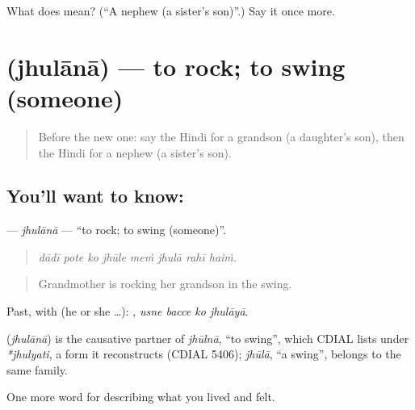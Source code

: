 \begin{tcolorbox}[breakable,colback=teal!4,colframe=teal!35!black,title={Before you move on}]
What does  mean? (\textquotedblleft{}A nephew (a sister's son)\textquotedblright{}.) Say it once more.
\end{tcolorbox}
\section[\texorpdfstring{\hi{झुलाना} (jhulānā)}{झुलाना (jhulānā)}]{ (jhulānā) — to rock; to swing (someone)}

\label{lesson:HI-C502-jhulana}



\begin{quote}
Before the new one: say the Hindi for a grandson (a daughter's son), then the Hindi for a nephew (a sister's son).
\end{quote}

\subsection*{You'll want to know: }
\textbf{} — \emph{jhulānā} — \textquotedblleft{}to rock; to swing (someone)\textquotedblright{}.

\begin{quote}
       
\end{quote}

\begin{quote}
\emph{dādī pote ko jhūle meṁ jhulā rahī haiṁ.}
\end{quote}

\begin{quote}
Grandmother is rocking her grandson in the swing.
\end{quote}

Past, with  (he or she …):    , \emph{usne bacce ko jhulāyā}.

\begin{cousinweb}
\textbf{} (\emph{jhulānā}) is the causative partner of \emph{jhūlnā}, \textquotedblleft{}to swing\textquotedblright{}, which CDIAL lists under \emph{*jhulyati}, a form it reconstructs (CDIAL 5406); \emph{jhūlā}, \textquotedblleft{}a swing\textquotedblright{}, belongs to the same family.
\end{cousinweb}

\begin{grammarlens}[title={What you've built}]
One more word for describing what you lived and felt.
\end{grammarlens}

